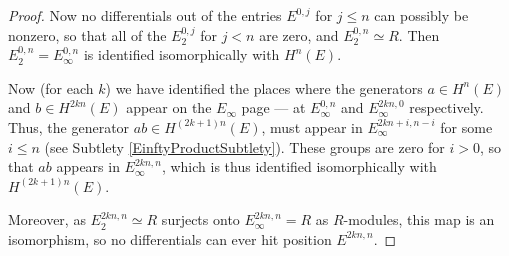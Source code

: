 \documentclass{article}
\theoremstyle{definition}
\begin{document}
\begin{proof}
Now no differentials out of the entries $E^{0,j}$ for $j\leq n$ can possibly be nonzero, so that all of the $E_2^{0,j}$ for $j<n$ are zero, and $E_2^{0,n}\simeq R$. Then $E_2^{0,n}=E_\infty^{0,n}$ is identified isomorphically with $H^n(E)$.

Now (for each $k$) we have identified the places where the generators $a\in H^n(E)$ and $b\in H^{2kn}(E)$ appear on the $E_{\infty}$ page --- at $E_\infty^{0,n}$ and $E_\infty^{2kn,0}$ respectively. Thus, the generator $ab\in H^{(2k+1)n}(E)$, must appear in $E_{\infty}^{2kn+i,n-i}$ for some $i\leq n$ (see Subtlety \ref{EinftyProductSubtlety}).
These groups are zero for $i>0$, so that $ab$ appears in $E_{\infty}^{2kn,n}$, which is thus identified isomorphically with $H^{(2k+1)n}(E)$.

Moreover, as $E_2^{2kn,n}\simeq R$ surjects onto $E_\infty^{2kn,n}=R$ as $R$-modules, this map is an isomorphism, so no differentials can ever hit position $E^{2kn,n}$.

%


\end{proof}
\end{document}
